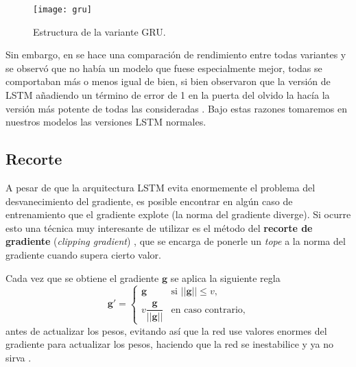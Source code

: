 \begin{figure}[htpb]
  \centering
  \texttt{[image: gru]}
  \caption{Estructura de la variante GRU.}
  \label{fig:gru}
\end{figure}

Sin embargo, en \cite{greff2016lstm} se hace una comparación de rendimiento entre todas variantes y se observó que no había un modelo que fuese especialmente mejor, todas se comportaban más o menos igual de bien, si bien \cite{gers1999learning} observaron que la versión de LSTM añadiendo un término de error de 1 en la puerta del olvido la hacía la versión más potente de todas las consideradas \cite{Goodfellow-et-al-2016}. Bajo estas razones tomaremos en nuestros modelos las versiones LSTM normales.

\subsection{Recorte}

A pesar de que la arquitectura LSTM evita enormemente el problema del desvanecimiento del gradiente, es posible encontrar en algún caso de entrenamiento que el gradiente explote (la norma del gradiente diverge). Si ocurre esto una técnica muy interesante de utilizar es el método del \textbf{recorte de gradiente} (\emph{clipping gradient}) \cite{pascanu2013difficulty}, que se encarga de ponerle un \emph{tope} a la norma del gradiente cuando supera cierto valor.

Cada vez que se obtiene el gradiente $\textbf{g}$ se aplica la siguiente regla
\begin{equation*}
  \textbf{g}' = \begin{cases} \textbf{g} & \text{si } ||\textbf{g}|| \leq v, \\ v\dfrac{\textbf{g}}{||\textbf{g}||} & \text{en caso contrario,} \end{cases}
  \label{eq:clipping}
\end{equation*}
antes de actualizar los pesos, evitando así que la red use valores enormes del gradiente para actualizar los pesos, haciendo que la red se inestabilice y ya no sirva \cite{Goodfellow-et-al-2016}.

\endinput
